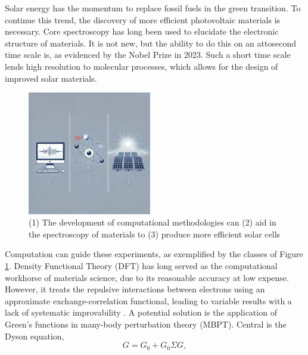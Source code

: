 Solar energy has the momentum to replace fossil fuels in the green transition. To continue this trend, the discovery of more efficient photovoltaic materials is necessary. Core spectroscopy has long been used to elucidate the electronic structure of materials. It is not new, but the ability to do this on an attosecond time scale is, as evidenced by the Nobel Prize in 2023. Such a short time scale lends high resolution to molecular processes, which allows for the design of improved solar materials. 
\begin{figure}
   \centering
   \includegraphics[width=0.48\textwidth]{picture.png}
   \caption{(1) The development of computational methodologies can (2) aid in the spectroscopy of materials to (3) produce more efficient solar cells}
   \label{fig:fig1}
\end{figure}
Computation can guide these experiments, as exemplified by the classes of Figure \ref{fig:fig1}. Density Functional Theory (DFT) has long served as the computational workhorse of materials science, due to its reasonable accuracy at low expense. However, it treats the repulsive interactions between electrons using an approximate exchange-correlation functional, leading to variable results with a lack of systematic improvability \cite{kozlowski_elucidating_2021}. A potential solution is the application of Green's functions in many-body perturbation theory (MBPT). Central is the Dyson equation,
\begin{equation}
G = G_0 + G_0 \Sigma G,
\label{eqn:dyson}
\end{equation}

